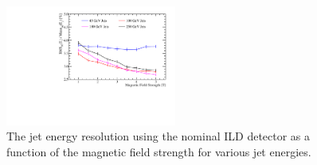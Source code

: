 \begin{figure}[h!]
\includegraphics[width=0.5\textwidth]{OptimisationStudies/Plots/JetEnergyResolutions/JER_vs_MagneticFieldStrength.pdf}
\caption[The jet energy resolution using the nominal ILD detector as a function of the magnetic field strength for various jet energies.]{The jet energy resolution using the nominal ILD detector as a function of the magnetic field strength for various jet energies.}
\label{fig:bfield}
\end{figure}

